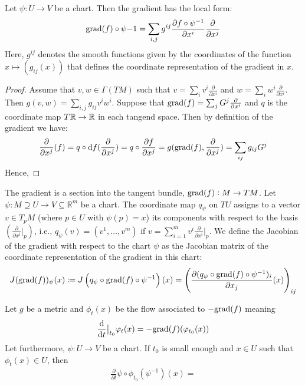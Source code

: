 \begin{lemma}
	Let $\psi:U\to V$ be a chart. Then the gradient has the local form:
	\begin{align*}
		\mathrm{grad}(f)\circ \psi{-1} =\sum_{i,j}g^{ij} \frac{\partial f \circ \psi^{-1}}{\partial x^i} \frac{\partial }{\partial x^j}
	\end{align*}
	Here, $g^{ij}$ denotes the smooth functions given by the coordinates of the function $x\mapsto (g_{ij}(x))$ that defines the coordinate representation of the gradient in $x$. 
\end{lemma}
\begin{proof} Assume that $v,w\in \Gamma( TM)$ such that $v=\sum_i v^i\frac{\partial	}{\partial x^i}$ and $w=\sum_i w^i\frac{\partial	}{\partial x^i}$. Then  $g(v,w)=\sum_{i,j} g_{ij} v^i w^i$.
Suppose that $\mathrm{grad}(f)=\sum_j G^j \frac{\partial}{\partial x^i}$ and $q$ is the coordinate map $T\mathbb{R}\to \mathbb{R}$ in each tangend space. Then by definition of the gradient we have:
\begin{align*}
\frac{\partial }{\partial x^j}(f)=	q \circ \mathop{}\!\mathrm{d} f (\frac{\partial }{\partial x^j})=q\circ \frac{\partial f}{\partial x^j}= g(\mathrm{grad}(f),\frac{\partial }{\partial x^j})= \sum_{ij}g_{ij} G^j
\end{align*}Hence, 
\end{proof}

\begin{definition}
	The gradient is a section into the tangent bundle, $\mathrm{grad}(f):M\to TM$.
	Let $\psi: M\supseteq U\to V \subseteq \mathbb{R}^m$ be a chart. The coordinate map $q_{\psi}$ on $TU$ assigns to a vector $v \in T_pM$ (where $p \in U$ with $\psi(p) = x$) its components with respect to the basis $\left(\frac{\partial}{\partial x^i}\big|_p\right)$, i.e., $q_{\psi}(v) = (v^1, \ldots, v^m)$ if $v = \sum_{i=1}^m v^i \frac{\partial}{\partial x^i}\big|_p$.
	We define the Jacobian of the gradient with respect to the chart $\psi$ as the Jacobian matrix of the coordinate representation of the gradient in this chart:
	\[
	J(\mathrm{grad}(f))_\psi(x) \coloneq J\left(q_{\psi}\circ \mathrm{grad}(f)\circ \psi^{-1}\right)(x) = \left(\frac{\partial (q_{\psi}\circ \mathrm{grad}(f)\circ \psi^{-1})_i}{\partial x_j}(x)\right)_{ij}
	\]
\end{definition}
\begin{lemma}
	Let $g$ be a metric and $\phi_t(x)$ be the flow associated to $-\mathrm{grad}(f)$ meaning
	\begin{align*}
		\frac{\mathop{}\!\mathrm{d}}{\mathop{}\!\mathrm{d} t}\big|_{t_0}\varphi_t(x)=-\mathrm{grad}(f)(\varphi_{t_0}(x))
	\end{align*} Let furthermore, $\psi:U\to V$ be a chart. If $t_0$ is small enough and $x\in U$ such that $\phi_t(x)\in U$, then 
	\begin{align*}
		\frac{\partial}{\partial t} \psi \circ \phi_{t_0}(\psi^{-1})(x)=	
	\end{align*}
\end{lemma}


